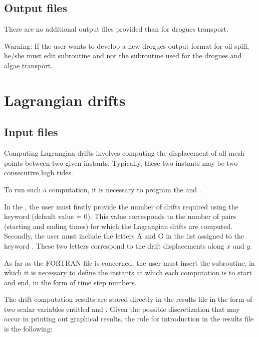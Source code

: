 \subsection{Output files}

There are no additional output files provided than for drogues transport.

\begin{WarningBlock}{Warning:}
If the user wants to develop a new drogues output format for oil spill,
he/she must edit  subroutine and not the 
subroutine used for the drogues and algae transport.
\end{WarningBlock}

\section{Lagrangian drifts}
\label{sec:lagr:drifts}

\subsection{Input files}

Computing Lagrangian drifts involves computing the displacement of all mesh
points between two given instants.
Typically, these two instants may be two consecutive high tides.

To run such a computation, it is necessary to program
the  and .

In the , the user must firstly provide the
number of drifts required using the keyword 
(default value = 0).
This value corresponds to the number of pairs (starting and ending times)
for which the Lagrangian drifts are computed.
Secondly, the user must include the letters A and G in the list assigned to the
keyword .
These two letters correspond to the drift displacements along $x$ and $y$.

As far as the FORTRAN file is concerned, the user must insert the
 subroutine, in which it is necessary to define the instants at
which each computation is to start and end, in the form of time step numbers.

The drift computation results are stored directly in the  results
file in the form of two scalar variables entitled  and
.
Given the possible discretization that may occur in printing out graphical
results, the rule for introduction in the results file is the following:

